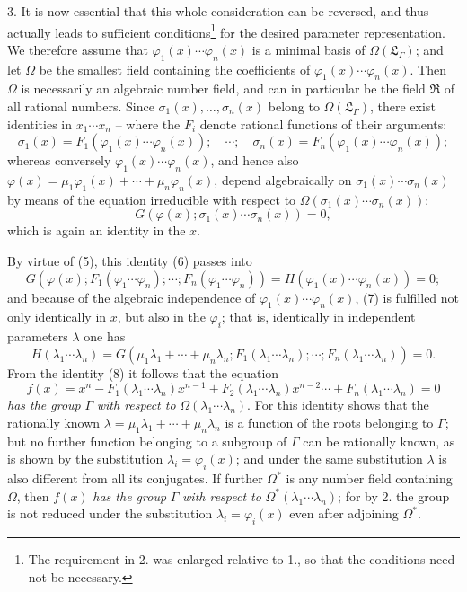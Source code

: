 \documentclass[11pt]{article}
\begin{document}
3. It is now essential that this whole consideration can be reversed, and thus actually leads to sufficient conditions\footnote{The requirement in 2. was enlarged relative to 1., so that the conditions need not be necessary.} for the desired parameter representation. We therefore assume that $\varphi_1(x)\cdots\varphi_n(x)$ is a minimal basis of $\Omega(\mathfrak L_\Gamma)$; and let $\Omega$ be the smallest field containing the coefficients of $\varphi_1(x)\cdots\varphi_n(x)$. Then $\Omega$ is necessarily an algebraic number field, and can in particular be the field $\mathfrak R$ of all rational numbers. Since $\sigma_1(x),\ldots,\sigma_n(x)$ belong to $\Omega(\mathfrak L_\Gamma)$, there exist identities in $x_1\cdots x_n$ -- where the $F_i$ denote rational functions of their arguments:
\begin{equation}
\sigma_1(x)=F_1(\varphi_1(x)\cdots\varphi_n(x));\quad \cdots;\quad
\sigma_n(x)=F_n(\varphi_1(x)\cdots\varphi_n(x));
\tag{5}
\end{equation}
whereas conversely $\varphi_1(x)\cdots\varphi_n(x)$, and hence also $\varphi(x)=\mu_1\varphi_1(x)+\cdots+\mu_n\varphi_n(x)$, depend algebraically on $\sigma_1(x)\cdots\sigma_n(x)$ by means of the equation irreducible with respect to $\Omega(\sigma_1(x)\cdots\sigma_n(x))$:
\begin{equation}
G(\varphi(x);\sigma_1(x)\cdots\sigma_n(x))=0,
\tag{6}
\end{equation}
which is again an identity in the $x$.

By virtue of (5), this identity (6) passes into
\begin{equation}
G(\varphi(x);F_1(\varphi_1\cdots\varphi_n);\cdots;F_n(\varphi_1\cdots\varphi_n))
=H(\varphi_1(x)\cdots\varphi_n(x))=0;
\tag{7}
\end{equation}
and because of the algebraic independence of $\varphi_1(x)\cdots\varphi_n(x)$, (7) is fulfilled not only identically in $x$, but also in the $\varphi_i$; that is, identically in independent parameters $\lambda$ one has
\begin{equation}
H(\lambda_1\cdots\lambda_n)=G(\mu_1\lambda_1+\cdots+\mu_n\lambda_n;F_1(\lambda_1\cdots\lambda_n);\cdots;F_n(\lambda_1\cdots\lambda_n))=0.
\tag{8}
\end{equation}
From the identity (8) it follows that the equation
\begin{equation}
f(x)=x^n-F_1(\lambda_1\cdots\lambda_n)x^{n-1}+F_2(\lambda_1\cdots\lambda_n)x^{n-2}\cdots\pm F_n(\lambda_1\cdots\lambda_n)=0
\tag{9}
\end{equation}
\emph{has the group} $\Gamma$ \emph{with respect to} $\Omega(\lambda_1\cdots\lambda_n)$. For this identity shows that the rationally known $\lambda=\mu_1\lambda_1+\cdots+\mu_n\lambda_n$ is a function of the roots belonging to $\Gamma$; but no further function belonging to a subgroup of $\Gamma$ can be rationally known, as is shown by the substitution $\lambda_i=\varphi_i(x)$; and under the same substitution $\lambda$ is also different from all its conjugates. If further $\Omega^*$ is any number field containing $\Omega$, then $f(x)$ \emph{has the group} $\Gamma$ \emph{with respect to} $\Omega^*(\lambda_1\cdots\lambda_n)$; for by 2. the group is not reduced under the substitution $\lambda_i=\varphi_i(x)$ even after adjoining $\Omega^*$.
\end{document}
